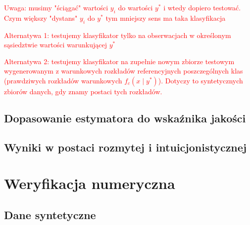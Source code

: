 \documentclass[12pt,a4paper,oneside]{book}
\theoremstyle{definition}
\begin{document}
\textcolor{red}{Uwaga: musimy "ściągać" wartości $y_i$ do wartości $y^*$ i wtedy dopiero testować. Czym większy "dystans" $y_i$ do $y^*$ tym mniejszy sens ma taka klasyfikacja}

\textcolor{red}{Alternatywa 1: testujemy klasyfikator tylko na obserwacjach w określonym sąsiedztwie wartości warunkującej $y^*$}

\textcolor{red}{Alternatywa 2: testujemy klasyfikator na zupełnie nowym zbiorze testowym wygenerowanym z warunkowych rozkładów referencyjnych poszczególnych klas (prawdziwych rozkładów warunkowych $f_c(x \mid y^*)$). Dotyczy to syntetycznych zbiorów danych, gdy znamy postaci tych rozkładów.}

\section{Dopasowanie estymatora do wskaźnika jakości}

\section{Wyniki w postaci rozmytej i intuicjonistycznej}

\chapter{Weryfikacja numeryczna}

\section{Dane syntetyczne}
\end{document}
